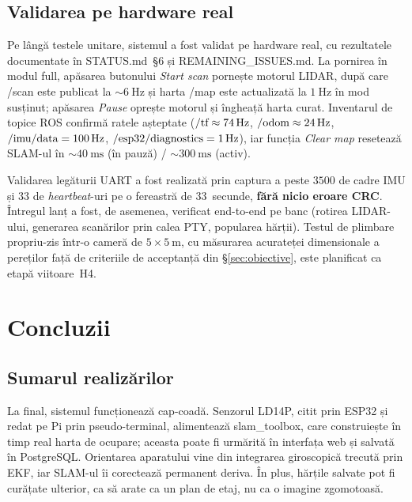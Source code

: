 \documentclass[a4paper,12pt,twoside,openany]{report}
\renewcommand{\texttt}[1]{\textnormal{#1}}
\begin{document}
\section{Validarea pe hardware real}
\label{sec:hardware-val}

Pe lângă testele unitare, sistemul a fost validat pe hardware real, cu
rezultatele documentate în \texttt{STATUS.md}~§6 și
\texttt{REMAINING\_ISSUES.md}. La pornirea în modul \texttt{full}, apăsarea
butonului \textit{Start scan} pornește motorul LIDAR, după care
\texttt{/scan} este publicat la $\sim\SI{6}{\hertz}$ și harta
\texttt{/map} este actualizată la $\SI{1}{\hertz}$ în mod susținut;
apăsarea \textit{Pause} oprește motorul și îngheață harta curat.
Inventarul de topice ROS confirmă ratele așteptate
($\texttt{/tf}\approx\SI{74}{\hertz}$, $\texttt{/odom}\approx\SI{24}{\hertz}$,
$\texttt{/imu/data}=\SI{100}{\hertz}$,
$\texttt{/esp32/diagnostics}=\SI{1}{\hertz}$), iar funcția
\textit{Clear map} resetează SLAM-ul în $\sim\SI{40}{\milli\second}$ (în
pauză) / $\sim\SI{300}{\milli\second}$ (activ).

Validarea legăturii UART a fost realizată prin captura a peste $3500$ de
cadre IMU și $33$ de \textit{heartbeat}-uri pe o fereastră de $33$~secunde,
\textbf{fără nicio eroare CRC}. Întregul lanț a fost, de asemenea,
verificat end-to-end pe banc (rotirea LIDAR-ului, generarea scanărilor prin
calea PTY, popularea hărții). Testul de plimbare propriu-zis într-o cameră
de $5\times\SI{5}{\meter}$, cu măsurarea acurateței dimensionale a pereților
față de criteriile de acceptanță din §\ref{sec:obiective}, este planificat
ca etapă viitoare~H4.

\clearpage

\chapter{Concluzii}
\label{cap:concluzii}

\section{Sumarul realizărilor}
\label{sec:summary}

La final, sistemul funcționează cap-coadă. Senzorul LD14P, citit prin ESP32 și
redat pe Pi prin pseudo-terminal, alimentează slam\_toolbox, care construiește
în timp real harta de ocupare; aceasta poate fi urmărită în interfața web și
salvată în PostgreSQL. Orientarea aparatului vine din integrarea giroscopică
trecută prin EKF, iar SLAM-ul îi corectează permanent deriva. În plus, hărțile
salvate pot fi curățate ulterior, ca să arate ca un plan de etaj, nu ca o
imagine zgomotoasă.
\end{document}
